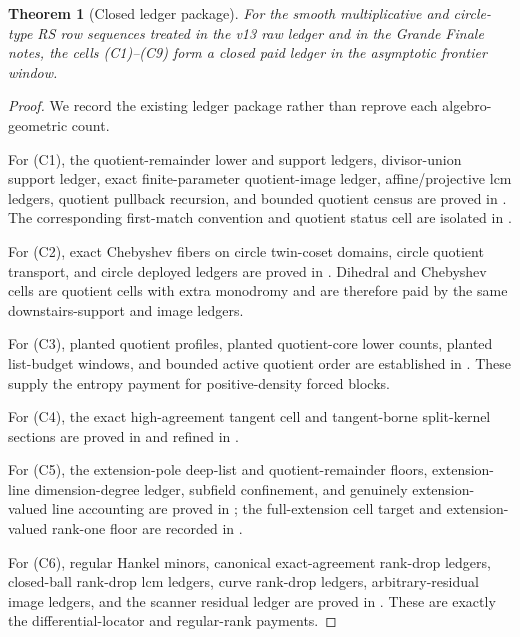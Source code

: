 \documentclass[11pt,a4paper]{amsart}
\numberwithin{equation}{section}
\newtheorem{theorem}{Theorem}[section]
\theoremstyle{remark}
\begin{document}
\begin{theorem}[Closed ledger package]\label{thm:closed-ledger-package}
For the smooth multiplicative and circle-type RS row sequences treated in the v13 raw ledger and in the Grande Finale notes, the cells \textup{(C1)--(C9)} form a closed paid ledger in the asymptotic frontier window.
\end{theorem}

\begin{proof}
We record the existing ledger package rather than reprove each algebro-geometric count.

For \textup{(C1)}, the quotient-remainder lower and support ledgers, divisor-union support ledger, exact finite-parameter quotient-image ledger, affine/projective lcm ledgers, quotient pullback recursion, and bounded quotient census are proved in \cite[quotient-remainder, quotient support, quotient-image, and bounded-census ledgers]{Cho26CapV13}.  The corresponding first-match convention and quotient status cell are isolated in \cite{Cho26Grande}.

For \textup{(C2)}, exact Chebyshev fibers on circle twin-coset domains, circle quotient transport, and circle deployed ledgers are proved in \cite[Chebyshev and circle sections]{Cho26CapV13}.  Dihedral and Chebyshev cells are quotient cells with extra monodromy and are therefore paid by the same downstairs-support and image ledgers.

For \textup{(C3)}, planted quotient profiles, planted quotient-core lower counts, planted list-budget windows, and bounded active quotient order are established in \cite[planted quotient profile and bounded quotient census]{Cho26CapV13}.  These supply the entropy payment for positive-density forced blocks.

For \textup{(C4)}, the exact high-agreement tangent cell and tangent-borne split-kernel sections are proved in \cite[high-agreement tangent exact cell and split-kernel tangent-borne theorem]{Cho26CapV13} and refined in \cite[exact high-agreement tangent cell]{Cho26Grande}.

For \textup{(C5)}, the extension-pole deep-list and quotient-remainder floors, extension-line dimension-degree ledger, subfield confinement, and genuinely extension-valued line accounting are proved in \cite[extension-pole and extension-line ledgers]{Cho26CapV13}; the full-extension cell target and extension-valued rank-one floor are recorded in \cite{Cho26Grande}.

For \textup{(C6)}, regular Hankel minors, canonical exact-agreement rank-drop ledgers, closed-ball rank-drop lcm ledgers, curve rank-drop ledgers, arbitrary-residual image ledgers, and the scanner residual ledger are proved in \cite[Hankel, rank-drop, curve, residual-image, and scanner ledgers]{Cho26CapV13}.  These are exactly the differential-locator and regular-rank payments.


\end{proof}
\end{document}
